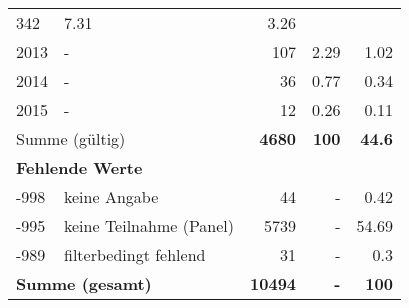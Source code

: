 \begin{longtable}{lXrrr}
       \num{342} &
       \num[round-mode=places,round-precision=2]{7,31} &
         \num[round-mode=places,round-precision=2]{3,26} \\

     2013 &
     \multicolumn{1}{X}{ -  } &


       \num{107} &
       \num[round-mode=places,round-precision=2]{2,29} &
         \num[round-mode=places,round-precision=2]{1,02} \\

     2014 &
     \multicolumn{1}{X}{ -  } &


       \num{36} &
       \num[round-mode=places,round-precision=2]{0,77} &
         \num[round-mode=places,round-precision=2]{0,34} \\

     2015 &
     \multicolumn{1}{X}{ -  } &


       \num{12} &
       \num[round-mode=places,round-precision=2]{0,26} &
         \num[round-mode=places,round-precision=2]{0,11} \\
     \midrule
     \multicolumn{2}{l}{Summe (gültig)} &
       \textbf{\num{4680}} &
     \textbf{100} &
       \textbf{\num[round-mode=places,round-precision=2]{44,6}} \\
     \multicolumn{5}{l}{\textbf{Fehlende Werte}}\\
       -998 &
       keine Angabe &
         \num{44} &
        - &
         \num[round-mode=places,round-precision=2]{0,42} \\
       -995 &
       keine Teilnahme (Panel) &
         \num{5739} &
        - &
         \num[round-mode=places,round-precision=2]{54,69} \\
       -989 &
       filterbedingt fehlend &
         \num{31} &
        - &
         \num[round-mode=places,round-precision=2]{0,3} \\
     \midrule
     \multicolumn{2}{l}{\textbf{Summe (gesamt)}} &
          \textbf{\num{10494}} &
        \textbf{-} &
        \textbf{100} \\
     \bottomrule
     \end{longtable}
     
